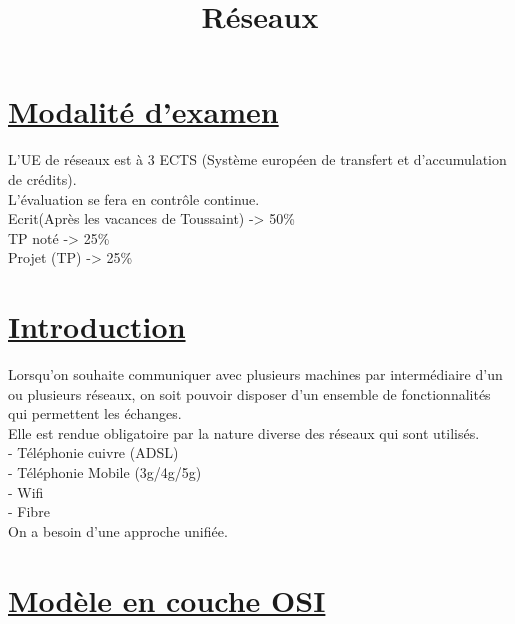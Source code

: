 \documentclass{article}
\title{Réseaux}
\author{}
\date{}
\begin{document}
\maketitle{}
\tableofcontents
\newpage
\section*{{\underline{Modalité d'examen}}}
L'UE de réseaux est à 3 ECTS (Système européen de transfert et d'accumulation de crédits). \\
L'évaluation se fera en contrôle continue. \\
Ecrit(Après les vacances de Toussaint) -> 50\% \\
TP noté -> 25\% \\
Projet (TP) -> 25\% \\

 

\section{\underline{Introduction}}
Lorsqu’on souhaite communiquer avec plusieurs machines par intermédiaire d’un ou plusieurs réseaux, on soit pouvoir disposer d’un ensemble de fonctionnalités qui permettent les échanges. \\
Elle est rendue obligatoire par la nature diverse des réseaux qui sont utilisés. \\ 
- Téléphonie cuivre (ADSL) \\
- Téléphonie Mobile (3g/4g/5g) \\
- Wifi \\
- Fibre \\
On a besoin d’une approche unifiée. \\

\newpage 
\section{\underline{Modèle en couche OSI}}
\end{document}
